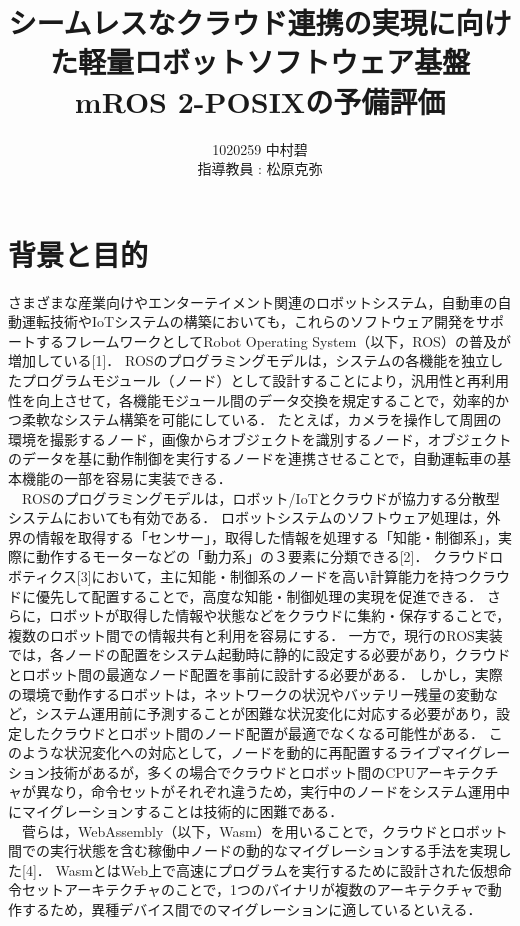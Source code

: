 \documentclass[11pt]{ujarticle}
\author{%
1020259 中村碧\\指導教員 : 松原克弥
}
\title{シームレスなクラウド連携の実現に向けた軽量ロボットソフトウェア基盤mROS 2-POSIXの予備評価}
\begin{document}
\maketitle

\section{背景と目的}
\label{sec:introduction}
さまざまな産業向けやエンターテイメント関連のロボットシステム，自動車の自動運転技術やIoTシステムの構築においても，これらのソフトウェア開発をサポートするフレームワークとしてRobot Operating System（以下，ROS）の普及が増加している[1]．
ROSのプログラミングモデルは，システムの各機能を独立したプログラムモジュール（ノード）として設計することにより，汎用性と再利用性を向上させて，各機能モジュール間のデータ交換を規定することで，効率的かつ柔軟なシステム構築を可能にしている．
たとえば，カメラを操作して周囲の環境を撮影するノード，画像からオブジェクトを識別するノード，オブジェクトのデータを基に動作制御を実行するノードを連携させることで，自動運転車の基本機能の一部を容易に実装できる．
\\　ROSのプログラミングモデルは，ロボット/IoTとクラウドが協力する分散型システムにおいても有効である．
ロボットシステムのソフトウェア処理は，外界の情報を取得する「センサー」，取得した情報を処理する「知能・制御系」，実際に動作するモーターなどの「動力系」の３要素に分類できる[2]．
クラウドロボティクス[3]において，主に知能・制御系のノードを高い計算能力を持つクラウドに優先して配置することで，高度な知能・制御処理の実現を促進できる．
さらに，ロボットが取得した情報や状態などをクラウドに集約・保存することで，複数のロボット間での情報共有と利用を容易にする．
一方で，現行のROS実装では，各ノードの配置をシステム起動時に静的に設定する必要があり，クラウドとロボット間の最適なノード配置を事前に設計する必要がある．
しかし，実際の環境で動作するロボットは，ネットワークの状況やバッテリー残量の変動など，システム運用前に予測することが困難な状況変化に対応する必要があり，設定したクラウドとロボット間のノード配置が最適でなくなる可能性がある．
このような状況変化への対応として，ノードを動的に再配置するライブマイグレーション技術があるが，多くの場合でクラウドとロボット間のCPUアーキテクチャが異なり，命令セットがそれぞれ違うため，実行中のノードをシステム運用中にマイグレーションすることは技術的に困難である．
\\　菅らは，WebAssembly（以下，Wasm）を用いることで，クラウドとロボット間での実行状態を含む稼働中ノードの動的なマイグレーションする手法を実現した[4]．
WasmとはWeb上で高速にプログラムを実行するために設計された仮想命令セットアーキテクチャのことで，1つのバイナリが複数のアーキテクチャで動作するため，異種デバイス間でのマイグレーションに適しているといえる．
\end{document}
